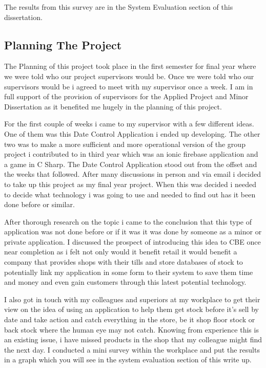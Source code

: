 The results from this survey are in the System Evaluation section of this dissertation. 

\subsection{Planning The Project}
The Planning of this project took place in the first semester for final year where we were told who our project supervisors would be. Once we were told who our supervisors would be i agreed to meet with my supervisor once a week. I am in full support of the provision of supervisors for the Applied Project and Minor Dissertation as it benefited me hugely in the planning of this project. 
\newline

For the first couple of weeks i came to my supervisor with a few different ideas. One of them was this Date Control Application i ended up developing. The other two was to make a more sufficient and more operational version of the group project i contributed to in third year which was an ionic firebase application and a game in C Sharp. The Date Control Application stood out from the offset and the weeks that followed. After many discussions in person and via email i decided to take up this project as my final year project. When this was decided i needed to decide what technology i was going to use and needed to find out has it been done before or similar. 
\newline

After thorough research on the topic i came to the conclusion that this type of application was not done before or if it was it was done by someone as a minor or private application. I discussed the prospect of introducing this idea to CBE once near completion as i felt not only would it benefit retail it would benefit a company that provides shops with their tills and store databases of stock to potentially link my application in some form to their system to save them time and money and even gain customers through this latest potential technology. 
\newline

I also got in touch with my colleagues and superiors at my workplace to get their view on the idea of using an application to help them get stock before it's sell by date and take action and catch everything in the store, be it shop floor stock or back stock where the human eye may not catch. Knowing from experience this is an existing issue, i have missed products in the shop that my colleague might find the next day. I conducted a mini survey within the workplace and put the results in a graph which you will see in the system evaluation section of this write up. 
\newline

